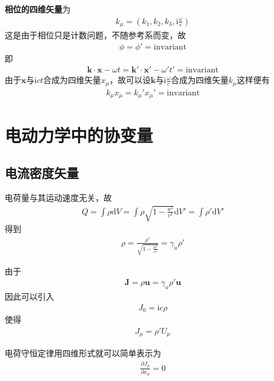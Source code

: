 \documentclass[main.tex]{subfiles}
\begin{document}
\textbf{相位的四维矢量}为
\begin{align}
    k_{\mu} = \left(k_1, k_2, k_3,\mathrm{i} \displaystyle \frac{\omega}{c}\right)
\end{align}
这是由于相位只是计数问题，不随参考系而变，故
\begin{align}
    \phi = \phi ' = \mathrm{invariant}
\end{align}
即
\begin{align}
    \boldsymbol{k} \cdot \boldsymbol{x} -\omega t = \boldsymbol{k}' \cdot \boldsymbol{x}' -\omega ' t' = \mathrm{invariant}
\end{align}
由于$\boldsymbol{x}$与$\mathrm{i}ct$合成为四维矢量$x_{\mu}$，故可以设$\boldsymbol{k}$与$\mathrm{i}\displaystyle \frac{\omega}{c}$合成为四维矢量$k_{\mu}$这样便有
\begin{align}
    k_{\mu} x_{\mu} = k_{\mu}' x_{\mu}' = \mathrm{invariant}
\end{align}

\section{电动力学中的协变量}
\subsection{电流密度矢量}
电荷量与其运动速度无关，故
\begin{align}
    Q = \int \rho \mathrm{d}V = \int \rho \sqrt{\displaystyle 1 - \frac{u^2}{c^2}}\mathrm{d}V' = \int \rho '\mathrm{d}V'
\end{align}
得到
\begin{align}
    \rho = \displaystyle \frac{\rho '}{\displaystyle \sqrt{1-\frac{u^2}{c^2}}} = \gamma _{u}\rho '
\end{align}

由于
\begin{align}
    \boldsymbol{J} = \rho \boldsymbol{u} = \gamma _u \rho '\boldsymbol{u}
\end{align}
因此可以引入
\begin{align}
    J_0 = \mathrm{i}c \rho
\end{align}
使得
\begin{align}
    J_{\mu} = \rho ' U_{\mu}
\end{align}

电荷守恒定律用四维形式就可以简单表示为
\begin{align}
    \frac{\partial J_{\mu}}{\partial x_{\mu}} = 0
\end{align}
\end{document}
